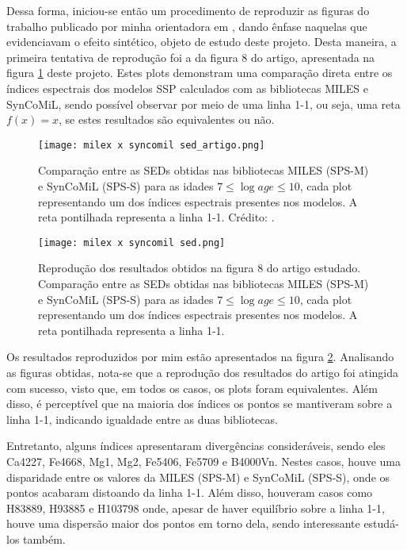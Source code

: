 \documentclass[12pt]{projeto}
\begin{document}
Dessa forma, iniciou-se então um procedimento de reproduzir as figuras do trabalho publicado por minha orientadora em \citet{Paula2020}, dando ênfase naquelas que evidenciavam o efeito sintético, objeto de estudo deste projeto. Desta maneira, a primeira tentativa de reprodução foi a da figura 8 do artigo, apresentada na figura \ref{fig:sed_miles_syncomil_artigo} deste projeto. Estes plots demonstram uma comparação direta entre os índices espectrais dos modelos SSP calculados com as bibliotecas MILES  e SynCoMiL, sendo possível observar por meio de uma linha 1-1, ou seja, uma reta \(f(x) = x\), se estes resultados são equivalentes ou não.


 \begin{figure}
\centering
\texttt{[image: milex x syncomil sed\_artigo.png]}
\caption{\label{fig:sed_miles_syncomil_artigo} Comparação entre as SEDs obtidas nas bibliotecas MILES (SPS-M) e SynCoMiL (SPS-S) para as idades \(7 \leq \log age \leq 10\), cada plot representando um dos índices espectrais presentes nos modelos. A reta pontilhada representa a linha 1-1. Crédito: \citet{Paula2020}.}
\end{figure}

 \begin{figure}
\centering
\texttt{[image: milex x syncomil sed.png]}
\caption{\label{fig:sed_miles_syncomil} Reprodução dos resultados obtidos na figura 8 do artigo estudado. Comparação entre as SEDs obtidas nas bibliotecas MILES (SPS-M) e SynCoMiL (SPS-S) para as idades \(7 \leq \log age \leq 10\), cada plot representando um dos índices espectrais presentes nos modelos. A reta pontilhada representa a linha 1-1.}
\end{figure}

Os resultados reproduzidos por mim estão apresentados na figura \ref{fig:sed_miles_syncomil}.
Analisando as figuras obtidas, nota-se que a reprodução dos resultados do artigo foi atingida com sucesso, visto que, em todos os casos, os plots foram equivalentes. Além disso, é perceptível que na maioria dos índices os pontos se mantiveram sobre a linha 1-1, indicando igualdade entre as duas bibliotecas. 

Entretanto, alguns índices apresentaram divergências consideráveis, sendo eles Ca4227, Fe4668, Mg1, Mg2, Fe5406, Fe5709 e B4000Vn. Nestes casos, houve uma disparidade entre os valores da MILES (SPS-M) e SynCoMiL (SPS-S), onde os pontos acabaram distoando da linha 1-1. Além disso, houveram casos como H83889, H93885 e H103798 onde, apesar de haver equilíbrio sobre a linha 1-1, houve uma dispersão maior dos pontos em torno dela, sendo interessante estudá-los também. 
\end{document}
